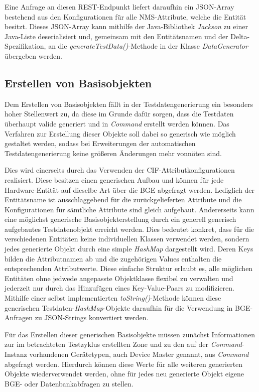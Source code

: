 Eine Anfrage an diesen \ac{REST}-Endpunkt liefert daraufhin ein \ac{JSON}-Array bestehend aus den Konfigurationen für alle \ac{NMS}-Attribute, welche die Entität besitzt. Dieses \ac{JSON}-Array kann mithilfe der Java-Bibliothek \textit{Jackson} zu einer Java-Liste deserialisiert und, gemeinsam mit den Entitätsnamen und der Delta-Spezifikation, an die \textit{generateTestData()}-Methode in der Klasse \textit{DataGenerator} übergeben werden.

\subsection{Erstellen von Basisobjekten}\label{subsec:baseObjects}
Dem Erstellen von Basisobjekten fällt in der Testdatengenerierung ein besonders hoher Stellenwert zu, da diese im Grunde dafür sorgen, dass die Testdaten überhaupt valide generiert und in \textit{Command} erstellt werden können. Das Verfahren zur Erstellung dieser Objekte soll dabei so generisch wie möglich gestaltet werden, sodass bei Erweiterungen der automatischen Testdatengenerierung keine größeren Änderungen mehr vonnöten sind. 

Dies wird einerseits durch das Verwenden der \ac{CIF}-Attributkonfigurationen realisiert. Diese besitzen einen generischen Aufbau und können für jede Hardware-Entität auf dieselbe Art über die \ac{BGE} abgefragt werden. Lediglich der Entitätsname ist ausschlaggebend für die zurückgelieferten Attribute und die Konfigurationen für sämtliche Attribute sind gleich aufgebaut. Andererseits kann eine möglichst generische Basisobjekterstellung durch ein generell generisch aufgebautes Testdatenobjekt erreicht werden. Dies bedeutet konkret, dass für die verschiedenen Entitäten keine individuellen Klassen verwendet werden, sondern jedes generierte Objekt durch eine simple \textit{HashMap} dargestellt wird. Deren Keys bilden die Attributnamen ab und die zugehörigen Values enthalten die entsprechenden Attributwerte. Diese einfache Struktur erlaubt es, alle möglichen Entitäten ohne jedwede angepasste Objektklasse flexibel zu verwalten und jederzeit nur durch das Hinzufügen eines Key-Value-Paars zu modifizieren. Mithilfe einer selbst implementierten \textit{toString()}-Methode können diese generischen Testdaten-\textit{HashMap}-Objekte daraufhin für die Verwendung in \ac{BGE}-Anfragen zu \ac{JSON}-Strings konvertiert werden. 

Für das Erstellen dieser generischen Basisobjekte müssen zunächst Informationen zur im betrachteten Testzyklus erstellten Zone und zu den auf der \textit{Command}-Instanz vorhandenen Gerätetypen, auch Device Master genannt, aus \textit{Command} abgefragt werden. Hierdurch können diese Werte für alle weiteren generierten Objekte wiederverwendet werden, ohne für jedes neu generierte Objekt eigene \ac{BGE}- oder Datenbankabfragen zu stellen. 

